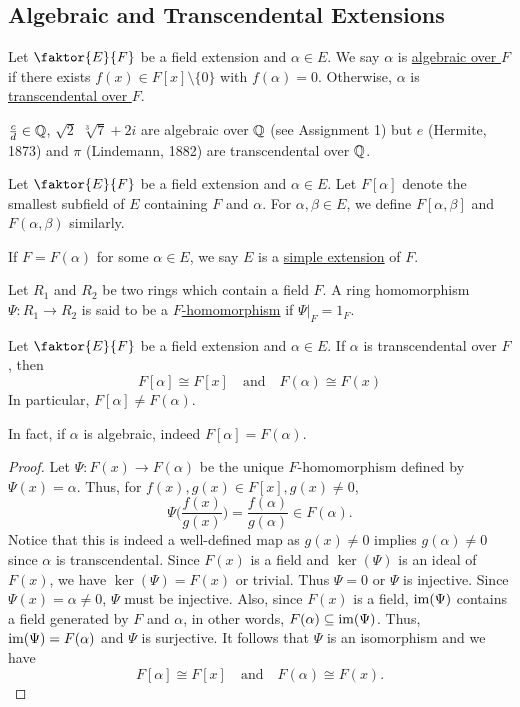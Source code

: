 \documentclass[11pt]{article}
\newcommand{\quotient}[2]{\faktor{#1}{#2}}
\begin{document}
\subsection{Algebraic and Transcendental Extensions}
\begin{definition}
Let $\quotient{E}{F}$ be a field extension and $\alpha \in E$. We say $\alpha$ is
\underline{algebraic over $F$} if there exists $f(x) \in F[x]\setminus \{0\}$
with $f(\alpha) = 0$. Otherwise, $\alpha$ is \underline{transcendental over
$F$}.
\end{definition}
\begin{example}
$\frac{c}{d} \in \mathbb{Q}$, $\sqrt 2$ $\sqrt[3]{7} + 2i$ are algebraic over $\mathbb{Q}$
(see Assignment 1) but $e$ (Hermite, 1873) and $\pi$ (Lindemann, 1882) are
transcendental over $\mathbb{Q}$.
\end{example}
Let $\quotient{E}{F}$ be a field extension and $\alpha \in E$. Let $F[\alpha]$ denote the
smallest subfield of $E$ containing $F$ and $\alpha$. For $\alpha, \beta \in E$,
we define $F[\alpha, \beta]$ and $F(\alpha, \beta)$ similarly.
\begin{definition}
If $F = F(\alpha)$ for some $\alpha \in E$, we say $E$ is a \underline{simple
extension} of $F$.
\end{definition}
\begin{definition}
Let $R_1$ and $R_2$ be two rings which contain a field $F$. A ring homomorphism
$\Psi: R_1 \to R_2$ is said to be a \underline{$F$-homomorphism} if $\Psi|_F =
1_F$.
\end{definition}
\begin{theorem} \label{theorem2}
Let $\quotient{E}{F}$ be a field extension and $\alpha \in E$. If $\alpha$ is transcendental
over $F$, then
\begin{equation*}
F[\alpha] \cong F[x] \quad \text{and} \quad F(\alpha) \cong F(x)
\end{equation*}
In particular, $F[\alpha] \neq F(\alpha)$.
\end{theorem}
\begin{remark}
In fact, if $\alpha$ is algebraic, indeed $F[\alpha] = F(\alpha)$.
\end{remark}
\begin{proof}
Let $\Psi:F(x) \to F(\alpha)$ be the unique $F$-homomorphism defined by $\Psi(x)
= \alpha$. Thus, for $f(x), g(x) \in F[x], g(x) \neq 0$, 
$$\Psi\bigg(\frac{f(x)}{g(x)}\bigg) = \frac{f(\alpha)}{g(\alpha)} \in
F(\alpha).$$ 
Notice that this is indeed a well-defined map as $g(x) \neq 0$ implies
$g(\alpha) \neq 0$ since $\alpha$ is transcendental. Since $F(x)$ is a field and
$\ker(\Psi)$ is an ideal of $F(x)$, we have $\ker(\Psi) = F(x)$ or trivial. Thus
$\Psi = 0$ or $\Psi$ is injective. Since $\Psi(x) = \alpha \neq 0$, $\Psi$ must
be injective. Also, since $F(x)$ is a field, $\operatorname{im}(\Psi)$ contains a field
generated by $F$ and $\alpha$, in other words, $F(\alpha) \subseteq \operatorname{im}(\Psi)$.
Thus, $\operatorname{im}(\Psi) = F(\alpha)$ and $\Psi$ is surjective. It follows that
$\Psi$ is an isomorphism and we have
\begin{equation*}
F[\alpha] \cong F[x] \quad \text{and} \quad F(\alpha) \cong F(x).
\end{equation*}
\end{proof}
\end{document}
